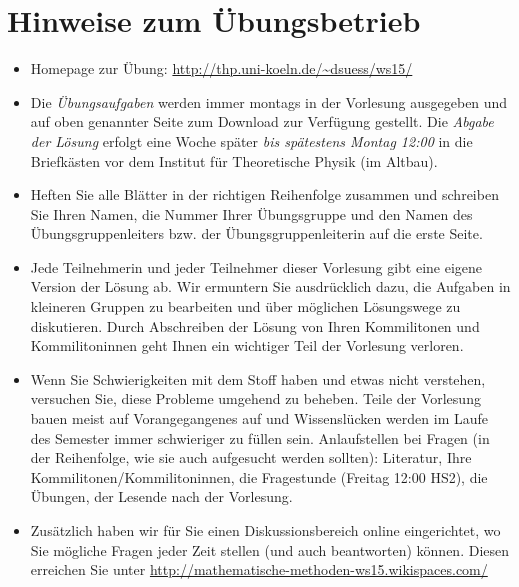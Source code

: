 \documentclass[11pt]{scrartcl}
\begin{document}
\maketitle

\section*{Hinweise zum Übungsbetrieb}
\begin{itemize}
  \item Homepage zur Übung: \url{http://thp.uni-koeln.de/~dsuess/ws15/}
  \item Die \emph{Übungsaufgaben} werden immer montags in der Vorlesung ausgegeben und auf oben genannter Seite zum Download zur Verfügung gestellt. Die \emph{Abgabe der Lösung} erfolgt eine Woche später \emph{bis spätestens Montag 12:00} in die Briefkästen vor dem Institut für Theoretische Physik (im Altbau).
  \item Heften Sie alle Blätter in der richtigen Reihenfolge zusammen und schreiben Sie Ihren Namen, die Nummer Ihrer Übungsgruppe und den Namen des Übungsgruppenleiters bzw. der Übungsgruppenleiterin auf die erste Seite. 
  \item Jede Teilnehmerin und jeder Teilnehmer dieser Vorlesung gibt eine eigene Version der Lösung ab. Wir ermuntern Sie ausdrücklich dazu, die Aufgaben in kleineren Gruppen zu bearbeiten und über möglichen Lösungswege zu diskutieren. Durch Abschreiben der Lösung von Ihren Kommilitonen und Kommilitoninnen geht Ihnen ein wichtiger Teil der Vorlesung verloren.
  \item Wenn Sie Schwierigkeiten mit dem Stoff haben und etwas nicht verstehen, versuchen Sie, diese Probleme umgehend zu beheben. Teile der Vorlesung bauen meist auf Vorangegangenes auf und Wissenslücken werden im Laufe des Semester immer schwieriger zu füllen sein. Anlaufstellen bei Fragen (in der Reihenfolge, wie sie auch aufgesucht werden sollten): Literatur, Ihre Kommilitonen/Kommilitoninnen, die Fragestunde (Freitag 12:00 HS2), die Übungen, der Lesende nach der Vorlesung.
  \item Zusätzlich haben wir für Sie einen Diskussionsbereich online eingerichtet, wo Sie mögliche Fragen jeder Zeit stellen (und auch beantworten) können. Diesen erreichen Sie unter \url{http://mathematische-methoden-ws15.wikispaces.com/}
\end{itemize}
\end{document}
